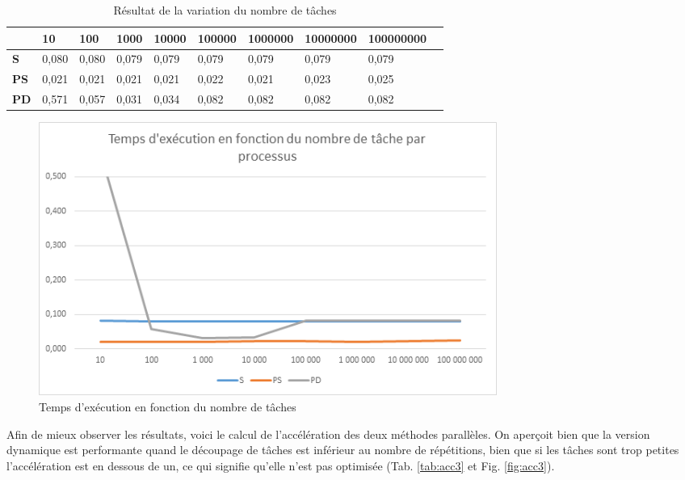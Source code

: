 \documentclass[a4paper,12pt]{article}
\begin{document}
\begin{table}[H]
\caption{Résultat de la variation du nombre de tâches}
\label{tab:tempsexec3}
\begin{tabular}{|l|l|l|l|l|l|l|l|l|l|}
\hline
            & \textbf{10} & \textbf{100} & \textbf{1000} & \textbf{10000} & \textbf{100000} & \textbf{1000000} & \textbf{10000000} & \textbf{100000000} \\ \hline
\textbf{S}  & 0,080        & 0,080        & 0,079       	 & 0,079         & 0,079          & 0,079           & 0,079            & 0,079             \\ \hline
\textbf{PS} & 0,021       & 0,021        & 0,021         & 0,021          & 0,022           & 0,021            & 0,023             & 0,025              \\ \hline
\textbf{PD} & 0,571       & 0,057        & 0,031         & 0,034          & 0,082           & 0,082 & 0,082 & 0,082              \\ \hline

\end{tabular}
\end{table}

\begin{figure}[H]
\center \includegraphics[width=15cm]{exec3}
\caption{Temps d'exécution en fonction du nombre de tâches}
\label{fig:tempsexec3}
\end{figure}

Afin de mieux observer les résultats, voici le calcul de l'accélération des deux méthodes parallèles. On aperçoit bien que la version dynamique est performante quand le découpage de tâches est inférieur au nombre de répétitions, bien que si les tâches sont trop petites l'accélération est en dessous de un, ce qui signifie qu'elle n'est pas optimisée (Tab. \ref{tab:acc3} et Fig. \ref{fig:acc3}). 
\end{document}

